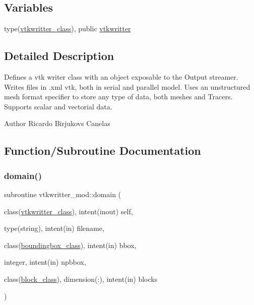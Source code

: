 \subsection*{Variables}
\begin{DoxyCompactItemize}
\item 
type(\mbox{\hyperlink{structvtkwritter__mod_1_1vtkwritter__class}{vtkwritter\+\_\+class}}), public \mbox{\hyperlink{namespacevtkwritter__mod_a80eabc5e7153822e7ddd54b662294c81}{vtkwritter}}
\end{DoxyCompactItemize}


\subsection{Detailed Description}
Defines a vtk writer class with an object exposable to the Output streamer. Writes files in .xml vtk, both in serial and parallel model. Uses an unstructured mesh format specifier to store any type of data, both meshes and Tracers. Supports scalar and vectorial data. 

\begin{DoxyAuthor}{Author}
Ricardo Birjukovs Canelas 
\end{DoxyAuthor}


\subsection{Function/\+Subroutine Documentation}
\mbox{\label{namespacevtkwritter__mod_a9f44d9fd1c5da759c4f2d721d12a8181}} 
\subsubsection{\texorpdfstring{domain()}{domain()}}
{\footnotesize\ttfamily subroutine vtkwritter\+\_\+mod\+::domain (\begin{DoxyParamCaption}\item[{class(\mbox{\hyperlink{structvtkwritter__mod_1_1vtkwritter__class}{vtkwritter\+\_\+class}}), intent(inout)}]{self,  }\item[{type(string), intent(in)}]{filename,  }\item[{class(\mbox{\hyperlink{structboundingbox__mod_1_1boundingbox__class}{boundingbox\+\_\+class}}), intent(in)}]{bbox,  }\item[{integer, intent(in)}]{npbbox,  }\item[{class(\mbox{\hyperlink{structblocks__mod_1_1block__class}{block\+\_\+class}}), dimension(\+:), intent(in)}]{blocks }\end{DoxyParamCaption})\hspace{0.3cm}{\ttfamily [private]}}



